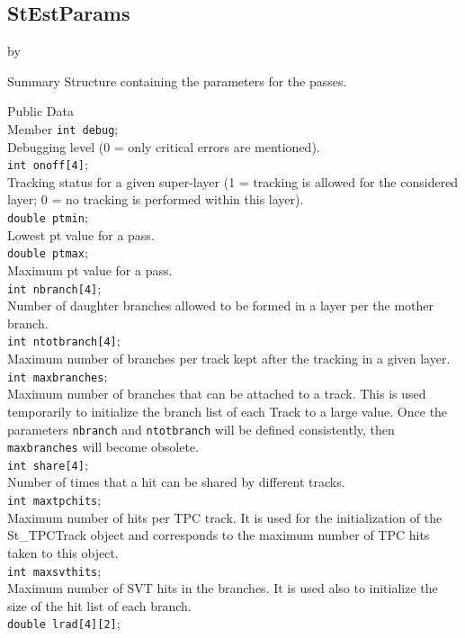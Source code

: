 \documentclass[twoside]{article}
\newcommand{\entrylabel}[1]{\mbox{\textbf{{#1}}}\hfil}%
\newenvironment{entry}
{\begin{list}{}%
    {\renewcommand{\makelabel}{\entrylabel}%
     \setlength{\labelwidth}{90pt}%
     \setlength{\leftmargin}{\labelwidth}
     \advance\leftmargin by \labelsep%
      }%
    }%
  {\end{list}}
\newcommand{\Entrylabel}[1]%
{\raisebox{0pt}[1ex][0pt]{\makebox[\labelwidth][l]%
    {\parbox[t]{\labelwidth}{\hspace{0pt}\textbf{{#1}}}}}}
\newenvironment{Entry}%
{\renewcommand{\entrylabel}{\Entrylabel}\begin{entry}}%
  {\end{entry}}
\begin{document}
\subsection{StEstParams}
\label{sec:StestParamsq}
\begin{Entry}
\item[Summary]
Structure containing the parameters for the passes.
\item[Public Data\\ Member]
\verb+int debug+;\\
Debugging level (0 = only critical errors are mentioned).\\
\verb+int onoff[4]+;\\
Tracking status for a given super-layer (1 = tracking is allowed for the 
considered layer; 0 = no tracking is performed within this layer).\\
\verb+double ptmin+;\\
Lowest pt value for a pass.\\
\verb+double ptmax+;\\
Maximum pt value for a pass.\\
\verb+int nbranch[4]+;\\
Number of daughter branches allowed to be formed in a layer per the
mother branch.\\
\verb+int ntotbranch[4]+;\\
Maximum number of branches per track kept after the tracking in a
given layer. 
\verb+int maxbranches+;\\
Maximum number of branches that can be attached to a track. This is
used temporarily to initialize the branch list of each Track to a
large value. Once the parameters \verb+nbranch+ and \verb+ntotbranch+
will be defined consistently, then \verb+maxbranches+ will become obsolete.\\
\verb+int share[4]+;\\
Number of times that a hit can be shared by different tracks.\\
\verb+int maxtpchits+;\\
Maximum number of hits per TPC track. It is used for the
initialization of the St\_TPCTrack object and corresponds to the
maximum number of TPC hits taken to this object.\\
\verb+int maxsvthits+;\\
Maximum number of SVT hits in the branches. It is used also to
initialize the size of the hit list of each branch. \\
\verb+double lrad[4][2]+;\\

\end{Entry}
\end{document}
